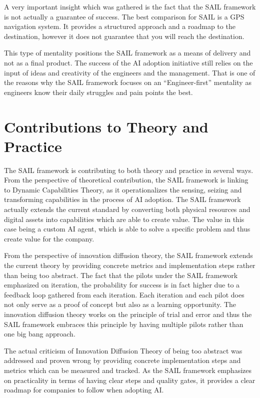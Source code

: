 \documentclass[]{imc-inf}
\begin{document}
A very important insight which was gathered is the fact that the SAIL
framework is not actually a guarantee of success. The best comparison
for SAIL is a GPS navigation system. It provides a structured approach
and a roadmap to the destination, however it does not guarantee that you
will reach the destination.

This type of mentality positions the SAIL framework as a means of
delivery and not as a final product. The success of the AI adoption
initiative still relies on the input of ideas and creativity of the
engineers and the management. That is one of the reasons why the SAIL
framework focuses on an ``Engineer-first'' mentality as engineers know
their daily struggles and pain points the best.

\section{Contributions to Theory and
	Practice}\label{contributions-to-theory-and-practice}


The SAIL framework is contributing to both theory and practice in several ways. From the perspective of theoretical contribution, the SAIL framework is linking to Dynamic Capabilities Theory, as it operationalizes the sensing, seizing and transforming capabilities in the process of AI adoption. The SAIL framework actually extends the current standard by converting both physical resources and digital assets into capabilities which are able to create value. The value in this case being a custom AI agent, which is able to solve a specific problem and thus create value for the company. 

From the perspective of innovation diffusion theory, the SAIL framework extends the current theory by providing concrete metrics and implementation steps rather than being too abstract.
The fact that the pilots under the SAIL framework emphasized on iteration, the probability for success is in fact higher due to a feedback loop gathered from each iteration. Each iteration and each pilot does not only serve as a proof of concept but also as a learning opportunity. The innovation diffusion theory works on the principle of trial and error and thus the SAIL framework embraces this principle by having multiple pilots rather than one big bang approach. 


The actual criticism of Innovation Diffusion Theory of being too abstract was addressed and proven wrong by providing concrete implementation steps and metrics which can be measured and tracked. As the SAIL framework emphasizes on practicality in terms of having clear steps and quality gates, it provides a clear roadmap for companies to follow when adopting AI. 
\end{document}
